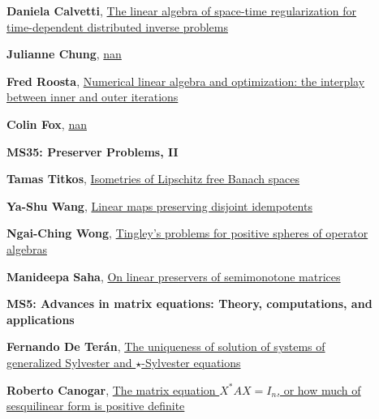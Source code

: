 \documentclass[ILAS2025-program.tex]{subfiles}
\begin{document}
\begin{description}
\begin{description}
    \item[] \hypertarget{up0311}{}\textbf{Daniela Calvetti}, \hyperlink{down0311}{The linear algebra of space-time regularization for time-dependent distributed inverse problems}
        \item[] \hypertarget{up0312}{}\textbf{Julianne Chung}, \hyperlink{down0312}{nan}
        \item[] \hypertarget{up0313}{}\textbf{Fred Roosta}, \hyperlink{down0313}{Numerical linear algebra and optimization: the interplay between inner and outer iterations
}
        \item[] \hypertarget{up0314}{}\textbf{Colin Fox}, \hyperlink{down0314}{nan}
        \end{description}
    \begin{description}
    \item[] {\color{mstitle}\textbf{MS35: Preserver Problems, II}} 
    \item[] \hypertarget{up0315}{}\textbf{Tamas Titkos}, \hyperlink{down0315}{Isometries of Lipschitz free Banach spaces}
        \item[] \hypertarget{up0316}{}\textbf{Ya-Shu Wang}, \hyperlink{down0316}{Linear maps preserving disjoint idempotents
}
        \item[] \hypertarget{up0317}{}\textbf{Ngai-Ching Wong}, \hyperlink{down0317}{Tingley's problems for positive spheres of operator algebras}
        \item[] \hypertarget{up0318}{}\textbf{Manideepa Saha}, \hyperlink{down0318}{On linear preservers of semimonotone matrices}
        \end{description}
    \begin{description}
    \item[] {\color{mstitle}\textbf{MS5: Advances in matrix equations: Theory, computations, and applications}} 
    \item[] \hypertarget{up0319}{}\textbf{Fernando De Terán}, \hyperlink{down0319}{The uniqueness of solution of systems of generalized Sylvester and $\star$-Sylvester equations}
        \item[] \hypertarget{up0320}{}\textbf{Roberto Canogar}, \hyperlink{down0320}{The matrix equation $X^*AX=I_n$, or how much of sesquilinear form is positive definite
}
\end{description}
\end{description}
\end{document}
